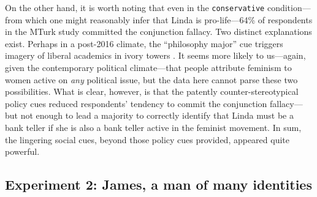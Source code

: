 \documentclass[12pt, letterpaper]{article}
\begin{document}
On the other hand, it is worth noting that even in the {\tt conservative} condition---from which one might reasonably infer that Linda is pro-life---64\% of respondents in the MTurk study committed the conjunction fallacy. Two distinct explanations exist. Perhaps in a post-2016 climate, the ``philosophy major'' cue triggers imagery of liberal academics in ivory towers \citep[e.g.,][]{pew_education}. It seems more likely to us---again, given the contemporary political climate---that people attribute feminism to women active on \emph{any} political issue, but the data here cannot parse these two possibilities. What is clear, however, is that the patently counter-stereotypical policy cues reduced respondents' tendency to commit the conjunction fallacy---but not enough to lead a majority to correctly identify that Linda must be a bank teller if she is also a bank teller active in the feminist movement. In sum, the lingering social cues, beyond those policy cues provided, appeared quite powerful.

\subsection{Experiment 2: James, a man of many identities}
\end{document}

